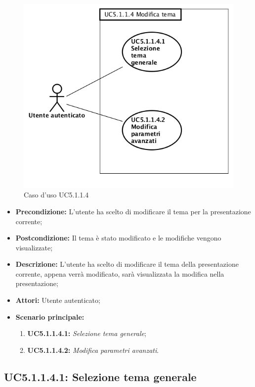 \begin{figure}[h]
	\begin{center}
	\includegraphics[scale=0.4]{diagram/UC5-1-1-4.png}
	\caption{Caso d'uso UC5.1.1.4}
	\end{center}
\end{figure}
\begin{itemize}
	\item \textbf{Precondizione:} L’utente ha scelto di modificare il tema per la presentazione corrente;
	\item \textbf{Postcondizione:} Il tema è stato modificato e le modifiche vengono visualizzate;
	\item \textbf{Descrizione:} L'utente ha scelto di modificare il tema della presentazione corrente, appena verrà modificato, sarà visualizzata la modifica nella presentazione;
	\item \textbf{Attori:} Utente autenticato;
	\item \textbf{Scenario principale:}
	\begin{enumerate}
		\item \textbf{ UC5.1.1.4.1:} \textit{ Selezione tema generale};
		\item \textbf{ UC5.1.1.4.2:} \textit{ Modifica parametri avanzati}.
	\end{enumerate}
\end{itemize}
\subsection{ UC5.1.1.4.1: Selezione tema generale}

